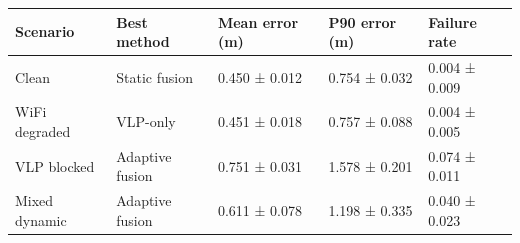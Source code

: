 \begin{tabular}{lllll}
\toprule
Scenario & Best method & Mean error (m) & P90 error (m) & Failure rate \\
\midrule
Clean & Static fusion & 0.450 ± 0.012 & 0.754 ± 0.032 & 0.004 ± 0.009 \\
WiFi degraded & VLP-only & 0.451 ± 0.018 & 0.757 ± 0.088 & 0.004 ± 0.005 \\
VLP blocked & Adaptive fusion & 0.751 ± 0.031 & 1.578 ± 0.201 & 0.074 ± 0.011 \\
Mixed dynamic & Adaptive fusion & 0.611 ± 0.078 & 1.198 ± 0.335 & 0.040 ± 0.023 \\
\bottomrule
\end{tabular}

